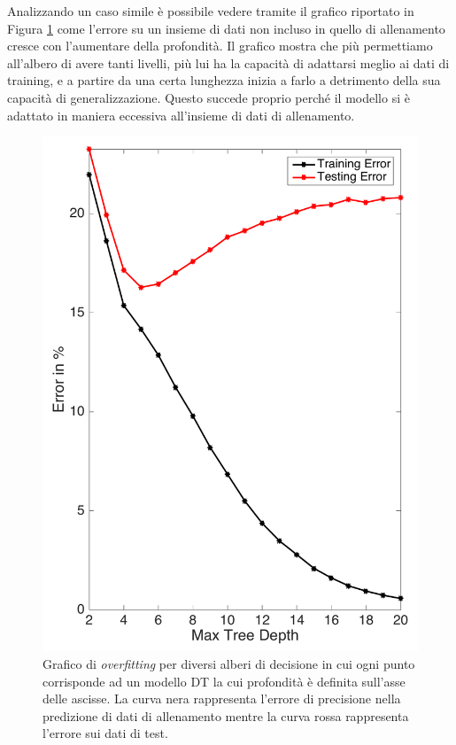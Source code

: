 \documentclass[12pt,italian]{report}
\begin{document}
Analizzando un caso simile è possibile vedere tramite il grafico riportato in Figura \ref{fig:overfit_decision_trees2} come l'errore su un insieme di dati non incluso in quello di allenamento cresce con l'aumentare della profondità. Il grafico mostra che più permettiamo all'albero di avere tanti livelli, più lui ha la capacità di adattarsi meglio ai dati di training, e a partire da una certa lunghezza inizia a farlo a detrimento della sua capacità di generalizzazione. Questo succede proprio perché il modello si è adattato in maniera eccessiva all'insieme di dati di allenamento.
\begin{figure}[h!]
	\center
	\includegraphics[scale=0.18]{../img/overfit_decision_trees2} %
	\caption{Grafico di \emph{overfitting} per diversi alberi di decisione in cui ogni punto corrisponde ad un modello DT la cui profondità è definita sull'asse delle ascisse. La curva nera rappresenta l'errore di precisione nella predizione di dati di allenamento mentre la curva rossa rappresenta l'errore sui dati di test. }
	\label{fig:overfit_decision_trees2}
\end{figure}
\end{document}
